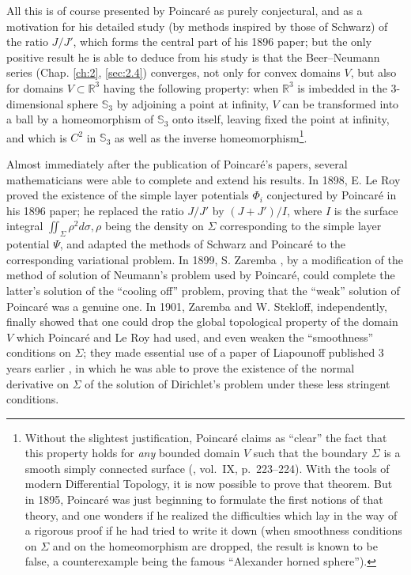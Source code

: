 \documentclass[12pt,a4paper,leqno,twoside]{extbook}
\newcommand{\R}{\mathbb{R}}
\newcommand{\Sph}{\mathbb{S}}
\begin{document}
All this is of course presented by Poincaré as purely conjectural, and as a motivation for his detailed study (by methods inspired by those of Schwarz) of the ratio \(J/J'\), which forms the central part of his 1896 paper; but the only positive result he is able to deduce from his study is that the Beer--Neumann series (Chap. \ref{ch:2}, \ref{sec:2.4}) converges, not only for convex domains \(V\), but also for domains \(V \subset \R^3\) having the following property: when \(\R^3\) is imbedded in the 3-dimensional sphere \(\Sph_3\) by adjoining a point at infinity, \(V\) can be transformed into a ball by a homeomorphism of \(\Sph_3\) onto itself, leaving fixed the point at infinity, and which is \(C^2\) in \(\Sph_3\) as well as the inverse homeomorphism\footnote{Without the slightest justification, Poincaré claims as ``clear'' the fact that this property holds for \emph{any} bounded domain \(V\) such that the boundary \(\Sigma\) is a smooth simply connected surface (\cite{177}, vol.~IX, p.~223--224). With the tools of modern Differential Topology, it is now possible to prove that theorem. But in 1895, Poincaré was just beginning to formulate the first notions of that theory, and one wonders if he realized the difficulties which lay in the way of a rigorous proof if he had tried to write it down (when smoothness conditions on \(\Sigma\) and on the homeomorphism are dropped, the result is known to be false, a counterexample being the famous ``Alexander horned sphere'').}.

Almost immediately after the publication of Poincaré's papers, several mathematicians were able to complete and extend his results. In 1898, E. Le Roy \cite{144} proved the existence of the simple layer potentials \(\Phi_i\) conjectured by Poincaré in his 1896 paper; he replaced the ratio \(J/J'\) by \((J+J')/I\), where \(I\) is the surface integral \(\iint_\Sigma \rho^2 d\sigma, \rho\) being the density on \(\Sigma\) corresponding to the simple layer potential \(\Psi\), and adapted the methods of Schwarz and Poincaré to the corresponding variational problem. In 1899, S. Zaremba \cite{232}, by a modification of the method of solution of Neumann's problem used by Poincaré, could complete the latter's solution of the ``cooling off'' problem, proving that the ``weak'' solution of Poincaré was a genuine one. In 1901, Zaremba and W. Stekloff, independently, finally showed that one could drop the global topological property of the domain \(V\) which Poincaré and Le Roy had used, and even weaken the ``smoothness'' conditions on \(\Sigma\); they made essential use of a paper of Liapounoff published 3 years earlier \cite{147}, in which he was able to prove the existence of the normal derivative on \(\Sigma\) of the solution of Dirichlet's problem under these less stringent conditions.
\end{document}
